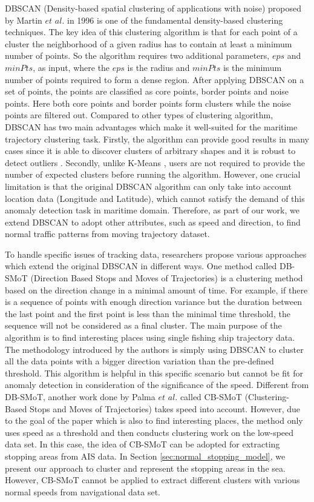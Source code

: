 \documentclass[12pt,glossary]{dalcsthesis}
\begin{document}
 DBSCAN (Density-based spatial clustering of applications with noise) proposed by Martin $et$ $al.$  \cite{DBScan96} in 1996 is one of the fundamental density-based clustering techniques.  The key idea of this clustering algorithm is that for each point of a cluster the neighborhood of a given radius has to contain at least a minimum number of points. So the algorithm requires two additional parameters, $eps$ and $minPts$, as input, where the $eps$ is the radius and $minPts$ is the minimum number of points required to form a dense region.  After applying DBSCAN on a set of points, the points are classified as core points, border points and noise points. Here both core points and border points form clusters while the noise points are filtered out. Compared to other types of clustering algorithm, DBSCAN has two main advantages which make it well-suited for the maritime trajectory clustering task. Firstly, the algorithm can provide good results in many cases since it is able to discover clusters of arbitrary shapes and it is robust to detect outliers \cite{hanjiaweibook}.  Secondly, unlike K-Means \cite{kmeans}, users are not required to provide the number of expected clusters before running the algorithm.  However, one crucial limitation is that the original DBSCAN algorithm can only take into account location data (Longitude and Latitude), which cannot satisfy the demand of this anomaly detection task in maritime domain.  Therefore, as part of our work, we extend DBSCAN to adopt other attributes, such as speed and direction, to find normal traffic patterns from moving trajectory dataset.


To handle specific issues of tracking data, researchers propose various approaches which extend the original DBSCAN in different ways.   One method called DB-SMoT (Direction Based Stops and Moves of Trajectories) \cite{DDBscan} is a clustering method based on the direction change in a minimal amount of time. For example, if there is a sequence of points with enough direction variance but the duration between the last point and the first point is less than the minimal time threshold, the sequence will not be considered as a final cluster. The main purpose of the algorithm is to find interesting places using single fishing ship trajectory data. The methodology introduced by the authors is simply using DBSCAN to cluster all the data points with a bigger direction variation than the pre-defined threshold. This algorithm is helpful in this specific scenario but cannot be fit for anomaly detection in consideration of the significance of the speed. Different from DB-SMoT, another work done by Palma $et$ $al.$ \cite{CBSMoT} called CB-SMoT (Clustering-Based Stops and Moves of Trajectories) takes speed into account. However, due to the goal of the paper which is also to find interesting places, the method only uses speed as a threshold and then conducts clustering work on the low-speed data set. In this case, the idea of CB-SMoT can be adopted for extracting stopping areas from AIS data. In Section \ref{sec:normal_stopping_model}, we present our approach to cluster and represent the stopping areas in the sea. However, CB-SMoT cannot be applied to extract different clusters with various normal speeds from navigational data set. 
\end{document}
